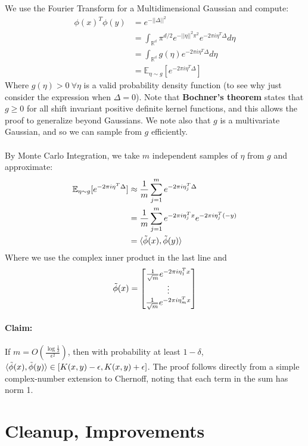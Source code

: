 \documentclass[11pt]{article}
\begin{document}
We use the Fourier Transform for a Multidimensional Gaussian and compute:
\begin{align*}
    \phi(x)^T\phi(y) &= e^{-||\Delta||^2}\\
    &= \int_{\mathbb{R^d}} \pi^{d/2} e^{-||\eta||^2 \pi^2} e^{-2\pi i \eta^T \Delta} d\eta\\
    &= \int_{\mathbb{R^d}} g(\eta) e^{-2\pi i \eta^T \Delta} d\eta\\
    &= \mathbb{E}_{\eta \sim g}[e^{-2 \pi i \eta^T \Delta}]
\end{align*}
Where $g(\eta)>0 \ \forall \eta$ is a valid probability density function (to see why just consider the expression when $\Delta = 0$). Note that \textbf{Bochner's theorem} states that $g \geq 0$ for all shift invariant positive definite kernel functions, and this allows the proof to generalize beyond Gaussians. We note also that $g$ is a multivariate Gaussian, and so we can sample from $g$ efficiently.
\\\\By Monte Carlo Integration, we take $m$ independent samples of $\eta$ from $g$ and approximate:
\begin{align*}
    \mathbb{E}_{\eta \sim g}[e^{-2 \pi i \eta^T \Delta}] &\approx \frac{1}{m} \sum_{j=1}^m e^{-2 \pi i \eta_j^T \Delta}\\
    &= \frac{1}{m} \sum_{j=1}^m e^{-2 \pi i \eta_j^T x} e^{-2 \pi i \eta_j^T (-y)}\\
    &= \langle  \Tilde{\phi}(x),  \Tilde{\phi}(y) \rangle
\end{align*}
Where we use the complex inner product in the last line and
\[ \Tilde{\phi}(x) = \begin{bmatrix}
\frac{1}{\sqrt{m}} e^{-2\pi i \eta_1^T x}\\ \vdots \\ \frac{1}{\sqrt{m}} e^{-2\pi i \eta_m^T x}
\end{bmatrix}
\]
\paragraph{Claim:} If $m = O(\frac{\log \frac{1}{\delta}}{\epsilon^2})$, then with probability at least $1-\delta$, $\langle  \Tilde{\phi}(x),  \Tilde{\phi}(y) \rangle \in [K(x,y)-\epsilon, K(x,y)+\epsilon]$. The proof follows directly from a simple complex-number extension to Chernoff, noting that each term in the sum has norm 1. 

\section{Cleanup, Improvements}
\end{document}
